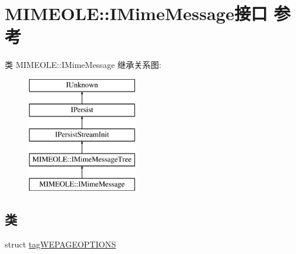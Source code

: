 \hypertarget{interface_m_i_m_e_o_l_e_1_1_i_mime_message}{}\section{M\+I\+M\+E\+O\+LE\+:\+:I\+Mime\+Message接口 参考}
\label{interface_m_i_m_e_o_l_e_1_1_i_mime_message}
类 M\+I\+M\+E\+O\+LE\+:\+:I\+Mime\+Message 继承关系图\+:\begin{figure}[H]
\begin{center}
\leavevmode
\includegraphics[height=5.000000cm]{interface_m_i_m_e_o_l_e_1_1_i_mime_message}
\end{center}
\end{figure}
\subsection*{类}
\begin{DoxyCompactItemize}
\item 
struct \hyperlink{struct_m_i_m_e_o_l_e_1_1_i_mime_message_1_1tag_w_e_p_a_g_e_o_p_t_i_o_n_s}{tag\+W\+E\+P\+A\+G\+E\+O\+P\+T\+I\+O\+NS}
\end{DoxyCompactItemize}
